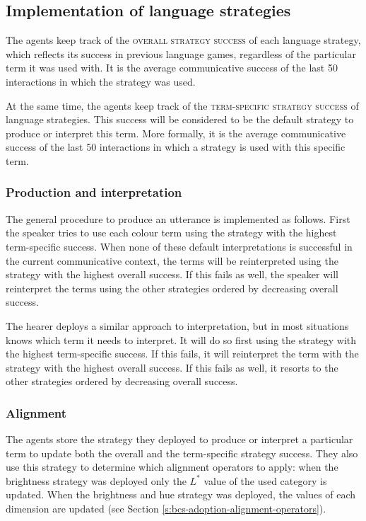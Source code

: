 \subsection{Implementation of language strategies}

The agents keep track of the \textsc{overall strategy success} of each
language strategy, which reflects its success in previous language
games, regardless of the particular term it was used with.  It is the
average communicative success of the last 50 interactions in which the
strategy was used.

At the same time, the agents keep track of the \textsc{term-specific
  strategy success} of language strategies. This success will be
considered to be the default strategy to produce or interpret this
term. More formally, it is the average communicative success of the
last 50 interactions in which a strategy is used with this specific
term.

\subsubsection{Production and interpretation}

The general procedure to produce an utterance is implemented as
follows. First the speaker tries to use each colour term using the
strategy with the highest term-specific success. When none of these
default interpretations is successful in the current communicative
context, the terms will be reinterpreted using the strategy with the
highest overall success. If this fails as well, the speaker will
reinterpret the terms using the other strategies ordered by
decreasing overall success.

The hearer deploys a similar approach to interpretation, but in most
situations knows which term it needs to interpret. It will do so first
using the strategy with the highest term-specific success. If this
fails, it will reinterpret the term with the strategy with the
highest overall success. If this fails as well, it resorts to the
other strategies ordered by decreasing overall success.

\subsubsection{Alignment}

The agents store the strategy they deployed to produce or interpret a
particular term to update both the overall and the term-specific
strategy success. They also use this strategy to determine which
alignment operators to apply: when the brightness strategy was
deployed only the $L^*$ value of the used category is updated. When
the brightness and hue strategy was deployed, the values of each
dimension are updated (see Section
\ref{s:bcs-adoption-alignment-operators}).

